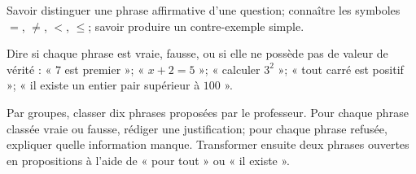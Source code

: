 \begin{prerequis}
Savoir distinguer une phrase affirmative d'une question; connaître les symboles
$=$, $\ne$, $<$, $\leq$; savoir produire un contre-exemple simple.
\end{prerequis}
\begin{automatismes}
Dire si chaque phrase est vraie, fausse, ou si elle ne possède pas de valeur de
vérité : « $7$ est premier »; « $x+2=5$ »; « calculer $3^2$ »; « tout carré est
positif »; « il existe un entier pair supérieur à $100$ ».
\end{automatismes}
\begin{activite}
Par groupes, classer dix phrases proposées par le professeur. Pour chaque phrase
classée vraie ou fausse, rédiger une justification; pour chaque phrase refusée,
expliquer quelle information manque. Transformer ensuite deux phrases ouvertes
en propositions à l'aide de « pour tout » ou « il existe ».
\end{activite}

